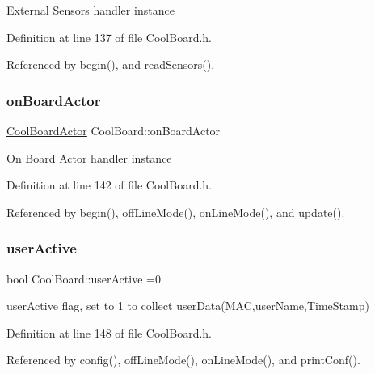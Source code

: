 External Sensors handler instance 

Definition at line 137 of file Cool\+Board.\+h.



Referenced by begin(), and read\+Sensors().

\mbox{\label{class_cool_board_a4ac693895c21025b8808653f2a4316e6}} 
\subsubsection{\texorpdfstring{on\+Board\+Actor}{onBoardActor}}
{\footnotesize\ttfamily \hyperlink{class_cool_board_actor}{Cool\+Board\+Actor} Cool\+Board\+::on\+Board\+Actor\hspace{0.3cm}{\ttfamily [private]}}

On Board Actor handler instance 

Definition at line 142 of file Cool\+Board.\+h.



Referenced by begin(), off\+Line\+Mode(), on\+Line\+Mode(), and update().

\mbox{\label{class_cool_board_a6395459131d6889a3005f79c7a35e964}} 
\subsubsection{\texorpdfstring{user\+Active}{userActive}}
{\footnotesize\ttfamily bool Cool\+Board\+::user\+Active =0\hspace{0.3cm}{\ttfamily [private]}}

user\+Active flag, set to 1 to collect user\+Data(\+M\+A\+C,user\+Name,\+Time\+Stamp) 

Definition at line 148 of file Cool\+Board.\+h.



Referenced by config(), off\+Line\+Mode(), on\+Line\+Mode(), and print\+Conf().

\mbox{\label{class_cool_board_a9c3f7ac625481ee2ae802a25d97a4ae0}} 
